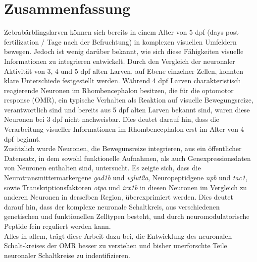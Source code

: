 \documentclass[12pt, a4paper, oneside]{article}
\begin{document}
\section*{Zusammenfassung}
Zebrabärblingslarven können sich bereits in einem Alter von 5 dpf (days post fertilization / Tage nach der Befruchtung) in komplexen visuellen Umfeldern bewegen. Jedoch ist wenig darüber bekannt, wie sich diese Fähigkeiten visuelle Informationen zu integrieren entwickelt. Durch den Vergleich der neuronaler Aktivität von 3, 4 und 5 dpf alten Larven, auf Ebene einzelner Zellen, konnten klare Unterschiede festgestellt werden. Während 4 dpf Larven charakteristisch reagierende Neuronen im Rhombencephalon besitzen, die für die optomotor response (OMR), ein typische Verhalten als Reaktion auf visuelle Bewegungsreize, verantwortlich sind und bereits aus 5 dpf alten Larven bekannt sind, waren diese Neuronen bei 3 dpf nicht nachweisbar. Dies deutet darauf hin, dass die Verarbeitung visueller Informationen im Rhombencephalon erst im Alter von 4 dpf beginnt.\\
Zusätzlich wurde Neuronen, die Bewegunsreize integrieren, aus ein öffentlicher Datensatz, in dem sowohl funktionelle Aufnahmen, als auch Genexpressionsdaten von Neuronen enthalten sind, untersucht.
Es zeigte sich, dass die Neurotransmittermarkergene \textit{gad1b} und \textit{vglut2a}, Neuropeptidgene \textit{npb} und \textit{tac1}, sowie Transkriptionsfaktoren \textit{otpa} und \textit{irx1b} in diesen Neuronen im Vergleich zu anderen Neuronen in derselben Region, überexprimiert werden. Dies deutet darauf hin, dass der komplexe neuronale Schaltkreis, aus verschiedenen genetischen und funktionellen Zelltypen besteht, und durch neuromodulatorische Peptide fein reguliert werden kann.\\
Alles in allem, trägt diese Arbeit dazu bei, die Entwicklung des neuronalen Schalt-kreises der OMR besser zu verstehen und bisher unerforschte Teile neuronaler Schaltkreise zu indentifizieren. 

\clearpage


\tableofcontents
\clearpage
\listoffigures
\listoftables
\end{document}
